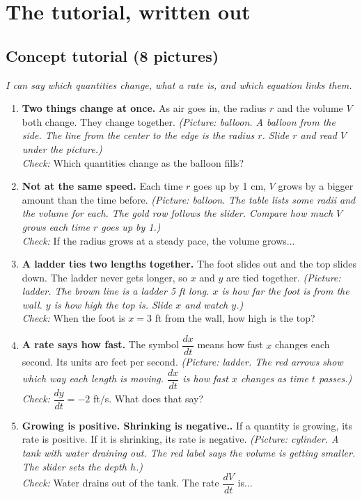 \documentclass[11pt]{article}
\begin{document}
\section*{The tutorial, written out}
\subsection*{Concept tutorial (8 pictures)}
\textit{I can say which quantities change, what a rate is, and which equation links them.}\par
\begin{enumerate}
\item \textbf{Two things change at once.} As air goes in, the radius $r$ and the volume $V$ both change. They change together. \textit{(Picture: balloon. A balloon from the side. The line from the center to the edge is the radius $r$. Slide $r$ and read $V$ under the picture.)}\\ \textit{Check:} Which quantities change as the balloon fills? 
\item \textbf{Not at the same speed.} Each time $r$ goes up by 1 cm, $V$ grows by a bigger amount than the time before. \textit{(Picture: balloon. The table lists some radii and the volume for each. The gold row follows the slider. Compare how much $V$ grows each time $r$ goes up by 1.)}\\ \textit{Check:} If the radius grows at a steady pace, the volume grows... 
\item \textbf{A ladder ties two lengths together.} The foot slides out and the top slides down. The ladder never gets longer, so $x$ and $y$ are tied together. \textit{(Picture: ladder. The brown line is a ladder 5 ft long. $x$ is how far the foot is from the wall. $y$ is how high the top is. Slide $x$ and watch $y$.)}\\ \textit{Check:} When the foot is $x=3$ ft from the wall, how high is the top? 
\item \textbf{A rate says how fast.} The symbol $\dfrac{dx}{dt}$ means how fast $x$ changes each second. Its units are feet per second. \textit{(Picture: ladder. The red arrows show which way each length is moving. $\dfrac{dx}{dt}$ is how fast $x$ changes as time $t$ passes.)}\\ \textit{Check:} $\dfrac{dy}{dt}=-2$ ft/s. What does that say? 
\item \textbf{Growing is positive. Shrinking is negative..} If a quantity is growing, its rate is positive. If it is shrinking, its rate is negative. \textit{(Picture: cylinder. A tank with water draining out. The red label says the volume is getting smaller. The slider sets the depth $h$.)}\\ \textit{Check:} Water drains out of the tank. The rate $\dfrac{dV}{dt}$ is... 

\end{enumerate}
\end{document}
